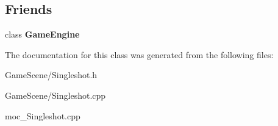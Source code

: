 \subsection*{Friends}
\begin{DoxyCompactItemize}
\item 
class {\bfseries Game\+Engine}\hypertarget{classSingleshot_a9ca20b077852bfc7b050d3a6a32d1a40}{}\label{classSingleshot_a9ca20b077852bfc7b050d3a6a32d1a40}

\end{DoxyCompactItemize}


The documentation for this class was generated from the following files\+:\begin{DoxyCompactItemize}
\item 
Game\+Scene/Singleshot.\+h\item 
Game\+Scene/Singleshot.\+cpp\item 
moc\+\_\+\+Singleshot.\+cpp\end{DoxyCompactItemize}
